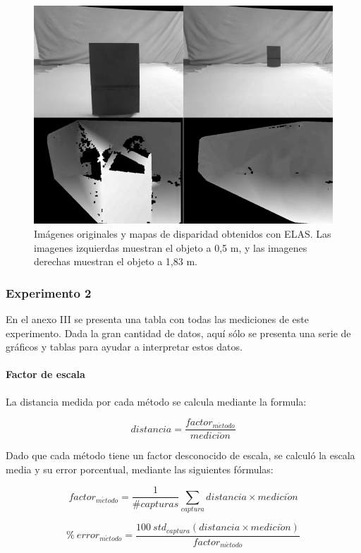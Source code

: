 \documentclass[11pt,a4paper,titlepage]{article}
\begin{document}
\begin{figure}[h!]

  \centering
    \includegraphics[width=1\textwidth]{f10.png}
  \caption{Imágenes originales y mapas de disparidad obtenidos con ELAS. Las imagenes izquierdas muestran el objeto a 0,5 m, y las imagenes derechas muestran el objeto a 1,83 m.}
\end{figure}

\subsubsection{Experimento 2}

En el anexo III se presenta una tabla con todas las mediciones de este experimento. Dada la gran cantidad de datos, aquí sólo se presenta una serie de gráficos y tablas para ayudar a interpretar estos datos.

\paragraph{Factor de escala}
\hfill \break
La distancia medida por cada método se calcula mediante la formula:

\[
	distancia = \frac{ factor_{m\acute{e}todo} }{ medici\acute{o}n }
\]

Dado que cada método tiene un factor desconocido de escala, se calculó la escala media y su error porcentual, mediante las siguientes fórmulas:

\[
	factor_{m\acute{e}todo} = \frac{1}{\#capturas} \sum_{captura} {distancia \times medici\acute{o}n}
\]

\[
	{\%\ error}_{m\acute{e}todo} = \frac{100 \  std_{captura}(distancia \times medici\acute{o}n)}{factor_{m\acute{e}todo}}
\]
\end{document}

